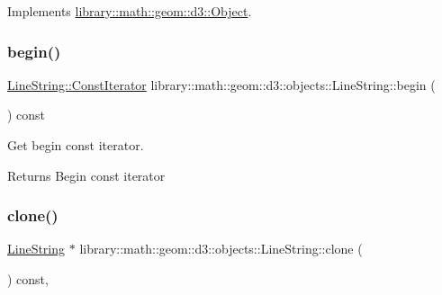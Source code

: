 Implements \hyperlink{classlibrary_1_1math_1_1geom_1_1d3_1_1_object_a5fc47b1ee5d9a28efc6010d3d1512470}{library\+::math\+::geom\+::d3\+::\+Object}.

\mbox{\label{classlibrary_1_1math_1_1geom_1_1d3_1_1objects_1_1_line_string_a218630b02ea7a4f32872fd1ee25f3359}} 
\subsubsection{\texorpdfstring{begin()}{begin()}}
{\footnotesize\ttfamily \hyperlink{classlibrary_1_1math_1_1geom_1_1d3_1_1objects_1_1_line_string_a87db0104282f9fcccdc5b1b99e2301e5}{Line\+String\+::\+Const\+Iterator} library\+::math\+::geom\+::d3\+::objects\+::\+Line\+String\+::begin (\begin{DoxyParamCaption}{ }\end{DoxyParamCaption}) const}



Get begin const iterator. 

\begin{DoxyReturn}{Returns}
Begin const iterator 
\end{DoxyReturn}
\mbox{\label{classlibrary_1_1math_1_1geom_1_1d3_1_1objects_1_1_line_string_a95ef100ab7053589b845980ca4c845b3}} 
\subsubsection{\texorpdfstring{clone()}{clone()}}
{\footnotesize\ttfamily \hyperlink{classlibrary_1_1math_1_1geom_1_1d3_1_1objects_1_1_line_string}{Line\+String} $\ast$ library\+::math\+::geom\+::d3\+::objects\+::\+Line\+String\+::clone (\begin{DoxyParamCaption}{ }\end{DoxyParamCaption}) const\hspace{0.3cm}{\ttfamily [override]}, {\ttfamily [virtual]}}



